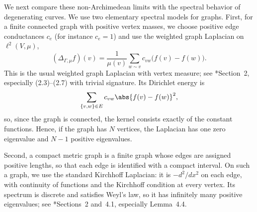 \documentclass[12pt]{amsart}
\begin{document}
We next compare these non-Archimedean limits with the spectral behavior
of degenerating curves. We use two elementary spectral models for graphs. First, for a
finite connected graph with positive vertex masses, we choose positive
edge conductances $c_e$ (for instance $c_e=1$) and use the weighted graph
Laplacian on $\ell^2(V,\mu)$,
\[
    (\Delta_{\Gamma,\mu} f)(v)
    =
    \frac{1}{\mu(v)}
    \sum_{w\sim v} c_{vw}\bigl(f(v)-f(w)\bigr).
\]
This is the usual weighted graph Laplacian with vertex measure; see
\cite{Lange-Liu-Peyerimhoff-Post2015}*{Section~2, especially (2.3)--(2.7)}
with trivial signature. Its Dirichlet energy is
\[
    \sum_{\{v,w\}\in E} c_{vw}\abs{f(v)-f(w)}^2,
\]
so, since the graph is connected, the kernel consists exactly of the
constant functions. Hence, if the graph has $N$ vertices, the Laplacian
has one zero eigenvalue and $N-1$ positive eigenvalues.

Second, a compact metric graph is a finite graph whose edges are assigned
positive lengths, so that each edge is identified with a compact interval.
On such a graph, we use the standard Kirchhoff Laplacian: it is
$-d^2/dx^2$ on each edge, with continuity of functions and the Kirchhoff
condition at every vertex. Its spectrum is discrete and satisfies Weyl's
law, so it has infinitely many positive eigenvalues; see
\cite{Berkolaiko2017}*{Sections~2 and~4.1, especially Lemma~4.4}.
\end{document}
